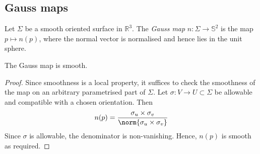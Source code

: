 \subsection{Gauss maps}
\begin{definition}
	Let $\Sigma$ be a smooth oriented surface in $\mathbb R^3$.
	The \textit{Gauss map} $n \colon \Sigma \to \mathbb S^2$ is the map $p \mapsto n(p)$, where the normal vector is normalised and hence lies in the unit sphere.
\end{definition}
\begin{lemma}
	The Gauss map is smooth.
\end{lemma}
\begin{proof}
	Since smoothness is a local property, it suffices to check the smoothness of the map on an arbitrary parametrised part of $\Sigma$.
	Let $\sigma \colon V \to U \subset \Sigma$ be allowable and compatible with a chosen orientation.
	Then
	\begin{align*}
		n(p) = \frac{\sigma_u \times \sigma_v}{\norm{\sigma_u \times \sigma_v}}
	\end{align*}
	Since $\sigma$ is allowable, the denominator is non-vanishing.
	Hence, $n(p)$ is smooth as required.
\end{proof}
